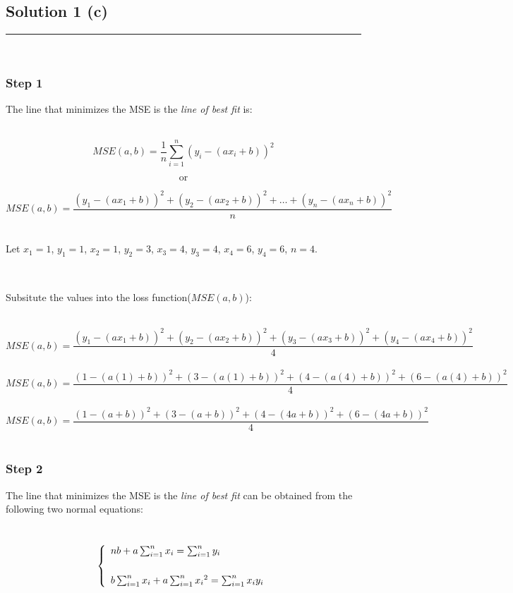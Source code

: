 \documentclass{article}
\begin{document}
\newpage

\subsection*{Solution 1 (c)}
\noindent\rule{\textwidth}{0.4pt}\\

\subsubsection*{Step 1}
\parbox{\textwidth}{
The line that minimizes the MSE is the \textit{line of best fit} is:
}\\

$$MSE(a,b) = \frac{1}{n} \sum_{i=1}^{n} (y_i-(ax_i+b))^2$$

$$\text{or}$$

$$MSE(a,b) = \frac{(y_1-(ax_1+b))^2+(y_2-(ax_2+b))^2+\hdots+(y_n-(ax_n+b))^2}{n} $$\\

\parbox{\textwidth}{
Let $x_1 = 1$, $y_1 = 1$, $x_2 = 1$, $y_2 = 3$, $x_3 = 4$, $y_3 = 4$, $x_4 = 6$, $y_4 = 6$, $n=4$.
}\\

\parbox{\textwidth}{
Subsitute the values into the loss function($MSE(a,b)$):
}\\

$$MSE(a,b) = \frac{(y_1-(ax_1+b))^2+(y_2-(ax_2+b))^2+(y_3-(ax_3+b))^2+(y_4-(ax_4+b))^2}{4} $$\\
$$MSE(a,b) = \frac{(1-(a(1)+b))^2+(3-(a(1)+b))^2+(4-(a(4)+b))^2+(6-(a(4)+b))^2}{4} $$\\
$$MSE(a,b) = \frac{(1-(a+b))^2+(3-(a+b))^2+(4-(4a+b))^2+(6-(4a+b))^2}{4} $$\\

\subsubsection*{Step 2}
\parbox{\textwidth}{
The line that minimizes the MSE is the \textit{line of best fit} can be obtained from the following two normal equations:
}\\

\[   \left\{
\begin{array}{ll}
      nb + a\sum_{i=1}^{n}x_i = \sum_{i=1}^{n}y_i\\
      \vspace{0.2cm}\\
      b\sum_{i=1}^{n}x_i + a\sum_{i=1}^{n}{x_i}^2 = \sum_{i=1}^{n}x_i y_i \\
\end{array} 
\right. \]
\end{document}
